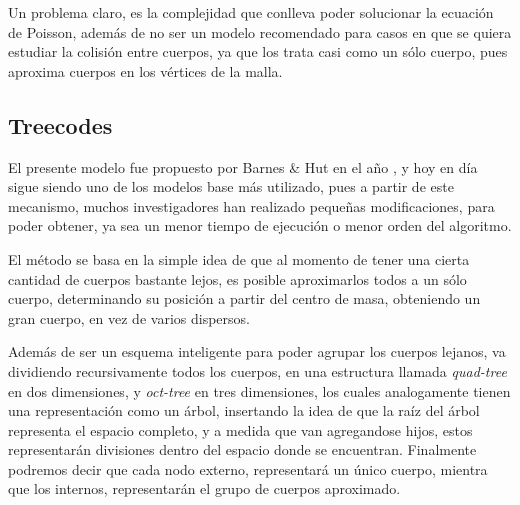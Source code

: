 Un problema claro, es la complejidad que conlleva poder solucionar la ecuación de Poisson,
además de no ser un modelo recomendado para casos en que se quiera estudiar la colisión
entre cuerpos, ya que los trata casi como un sólo cuerpo, pues
aproxima cuerpos en los vértices de la malla.





\subsection{Treecodes}

El presente modelo fue propuesto por Barnes \& Hut 
en el año , y hoy en día sigue siendo
uno de los modelos base más utilizado, pues a partir de este
mecanismo, muchos investigadores han realizado pequeñas modificaciones,
para poder obtener, ya sea un menor tiempo de ejecución o menor orden
del algoritmo.

El método se basa en la simple idea de que al momento de tener una cierta
cantidad de cuerpos bastante lejos, es posible aproximarlos todos
a un sólo cuerpo, determinando su posición a partir del centro de masa,
obteniendo un gran cuerpo, en vez de varios dispersos.

Además de ser un esquema inteligente para poder agrupar los cuerpos
lejanos, va dividiendo recursivamente todos los cuerpos,
en una estructura llamada \emph{quad-tree} en dos dimensiones,
y \emph{oct-tree} en tres dimensiones, los cuales analogamente
tienen una representación como un árbol, insertando la idea
de que la raíz del árbol representa el espacio completo,
y a medida que van agregandose hijos, estos representarán
divisiones dentro del espacio donde se encuentran.
Finalmente podremos decir que cada nodo externo,
representará un único cuerpo, mientra que los internos,
representarán el grupo de cuerpos aproximado.

